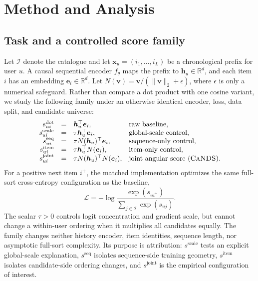 \documentclass[sigconf,anonymous,review]{acmart}
\newcommand{\cands}{\textsc{CaNDS}}
\begin{document}
\section{Method and Analysis}
\subsection{Task and a controlled score family}
Let $\mathcal I$ denote the catalogue and let $\bm x_u=(i_1,\ldots,i_L)$ be a chronological prefix for user $u$. A causal sequential encoder $f_\theta$ maps the prefix to $\bm h_u\in\mathbb R^d$, and each item $i$ has an embedding $\bm e_i\in\mathbb R^d$. Let $N(\bm v)=\bm v/(\|\bm v\|_2+\epsilon)$, where $\epsilon$ is only a numerical safeguard. Rather than compare a dot product with one cosine variant, we study the following family under an otherwise identical encoder, loss, data split, and candidate universe:
\begin{equation}
\begin{array}{rcll}
s^{\mathrm{dot}}_{ui}&=&\bm h_u^\top\bm e_i, & \text{raw baseline},\\
s^{\mathrm{scale}}_{ui}&=&\tau\bm h_u^\top\bm e_i, & \text{global-scale control},\\
s^{\mathrm{seq}}_{ui}&=&\tau N(\bm h_u)^\top\bm e_i, & \text{sequence-only control},\\
s^{\mathrm{item}}_{ui}&=&\tau\bm h_u^\top N(\bm e_i), & \text{item-only control},\\
s^{\mathrm{joint}}_{ui}&=&\tau N(\bm h_u)^\top N(\bm e_i), & \text{joint angular score (\cands{})}.
\end{array}\label{eq:family}
\end{equation}
For a positive next item $i^+$, the matched implementation optimizes the same full-sort cross-entropy configuration as the baseline,
\begin{equation}
\mathcal L=-\log\frac{\exp(s_{ui^+})}{\sum_{j\in\mathcal I}\exp(s_{uj})}.\label{eq:loss}
\end{equation}
The scalar $\tau>0$ controls logit concentration and gradient scale, but cannot change a within-user ordering when it multiplies all candidates equally. The family changes neither history encoder, item identities, sequence length, nor asymptotic full-sort complexity. Its purpose is attribution: $s^{\mathrm{scale}}$ tests an explicit global-scale explanation, $s^{\mathrm{seq}}$ isolates sequence-side training geometry, $s^{\mathrm{item}}$ isolates candidate-side ordering changes, and $s^{\mathrm{joint}}$ is the empirical configuration of interest.
\end{document}
